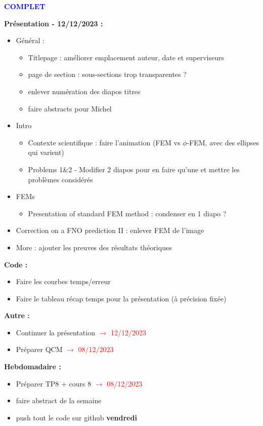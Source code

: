\textcolor{blue}{\textbf{\large{COMPLET}}}

\textbf{Présentation - 12/12/2023 :}
\begin{itemize}[label=$\square$] 
	\item[\done] Général :
	\begin{itemize}[label=\LARGE $\circ$]
		\item[\wontfix] Titlepage : améliorer emplacement auteur, date et superviseurs
		\item[\wontfix] page de section : sous-sections trop transparentes ?
		\item[\done] enlever numération des diapos titres
		\item[\done] faire abstracts pour Michel 
	\end{itemize}
	\item[\done] Intro
	\begin{itemize}[label=\LARGE $\circ$]
		\item[\swontfix] Contexte scientifique : faire l'animation (FEM vs $\phi$-FEM, avec des ellipses qui varient)
		\item[\sdone] Problems 1\&2 - Modifier 2 diapos pour en faire qu'une et mettre les problèmes considérés
	\end{itemize}
	\item[\done] FEMs
	\begin{itemize}[label=\LARGE $\circ$]
		\item[\sdone] Presentation of standard FEM method : condenser en 1 diapo ?
	\end{itemize}
	\item[\done] Correction on a FNO prediction II : enlever FEM de l'image
	\item[\wontfix] More : ajouter les preuves des résultats théoriques
\end{itemize}
\textbf{Code :}
\begin{itemize}[label=$\square$] 
	\item[\done] Faire les courbes temps/erreur
	\item[\done] Faire le tableau récap temps pour la présentation (à précision fixée)
\end{itemize}
\textbf{Autre :}
\begin{itemize}[label=$\square$] 
	\item[\done] Continuer la présentation \textcolor{red}{$\rightarrow$ 12/12/2023}
	\item[\done] Préparer QCM \textcolor{red}{$\rightarrow$ 08/12/2023}
\end{itemize}
\textbf{Hebdomadaire :}
\begin{itemize}[label=$\square$] 
	\item[\done] Préparer TP8 + cours 8 \textcolor{red}{$\rightarrow$ 08/12/2023}
	\item[\done] faire abstract de la semaine 
	\item[\done] push tout le code sur github \textbf{vendredi}
\end{itemize}